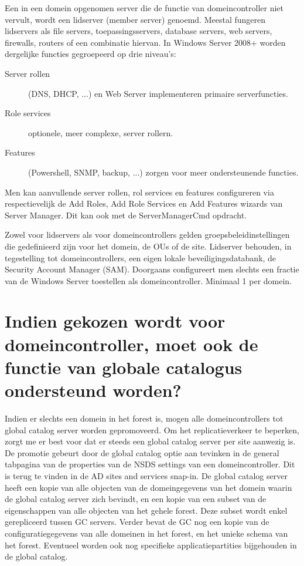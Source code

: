 Een in een domein opgenomen server die de functie van domeincontroller niet
vervult, wordt een lidserver (member server) genoemd. Meestal fungeren
lidservers als file servers, toepassingsservers, database servers, web servers,
firewalls, routers of een combinatie hiervan. In Windows Server 2008+ worden
dergelijke functies gegroepeerd op drie niveau's:
\begin{description}
	\item[Server rollen] (DNS, DHCP, ...) en Web Server implementeren
		primaire serverfuncties.
	\item[Role services] optionele, meer complexe, server rollern.
	\item[Features] (Powershell, SNMP, backup, ...) zorgen voor meer
		ondersteunende functies.
\end{description}
Men kan aanvullende server rollen, rol services en features configureren via
respectievelijk de Add Roles, Add Role Services en Add Features wizards van
Server Manager. Dit kan ook met de ServerManagerCmd opdracht.

Zowel voor lidservers als voor domeincontrollers gelden groepsbeleidinstellingen
die gedefinieerd zijn voor het domein, de OUs of de site. Lidserver behouden, in
tegestelling tot domeincontrollers, een eigen lokale beveiligingsdatabank, de
Security Account Manager (SAM).
Doorgaans configureert men slechts een fractie van de Windows Server toestellen
als domeincontroller. Minimaal 1 per domein.

\section{Indien gekozen wordt voor domeincontroller, moet ook de functie van
globale catalogus ondersteund worden?}

Indien er slechts een domein in het forest is, mogen alle domeincontrollers tot
global catalog server worden gepromoveerd. Om het replicatieverkeer te beperken,
zorgt me er best voor dat er steeds een global catalog server per site aanwezig
is. De promotie gebeurt door de global catalog optie aan tevinken in de general
tabpagina van de properties van de NSDS settings van een domeincontroller. Dit
is terug te vinden in de AD sites and services snap-in. De global catalog server
heeft een kopie van alle objecten van de domeingegevens van het domein waarin de
global catalog server zich bevindt, en een kopie van een subset van de
eigenschappen van alle objecten van het gehele forest. Deze subset wordt enkel
gerepliceerd tussen GC servers. Verder bevat de GC nog een kopie van de
configuratiegegevens van alle domeinen in het forest, en het unieke schema van
het forest. Eventueel worden ook nog specifieke applicatiepartities bijgehouden
in de global catalog.

